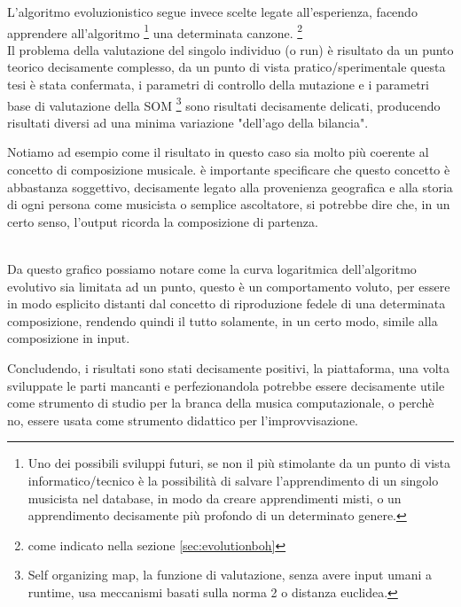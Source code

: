 L'algoritmo evoluzionistico segue invece scelte legate all'esperienza,
facendo apprendere all'algoritmo
\footnote{Uno dei possibili sviluppi futuri, se non il più stimolante da un
punto di vista informatico/tecnico è la possibilità di salvare l'apprendimento
di un singolo musicista nel database, in modo da creare apprendimenti misti,
o un apprendimento decisamente più profondo di un determinato genere.}
una determinata canzone. \footnote{come indicato nella sezione \ref{sec:evolutionboh}}
\\
Il problema della valutazione del singolo individuo (o run) è risultato da un
punto teorico decisamente complesso, da un punto di vista pratico/sperimentale
questa tesi è stata confermata, i parametri di controllo della mutazione e
i parametri base di valutazione della SOM
\footnote{Self organizing map, la funzione di valutazione,
senza avere input umani a runtime, usa meccanismi basati sulla norma 2
o distanza euclidea.}
sono risultati decisamente delicati, producendo risultati diversi ad una minima
variazione "dell'ago della bilancia".


Notiamo ad esempio come il risultato in questo caso sia molto più coerente al
concetto di composizione musicale.
è importante specificare che questo concetto è abbastanza soggettivo,
decisamente legato alla provenienza geografica e alla storia di ogni persona
come musicista o semplice ascoltatore, si potrebbe dire che, in un certo senso,
l'output ricorda la composizione di partenza.

\\

Da questo grafico possiamo notare come la curva logaritmica dell'algoritmo
evolutivo sia limitata ad un punto, questo è un comportamento voluto,
per essere in modo esplicito distanti dal concetto di riproduzione fedele di una
determinata composizione, rendendo quindi il tutto solamente, in un certo modo,
simile alla composizione in input.

Concludendo, i risultati sono stati decisamente positivi, la piattaforma, una volta
sviluppate le parti mancanti e perfezionandola potrebbe essere decisamente utile
come strumento di studio per la branca della musica computazionale, o perchè no,
essere usata come strumento didattico per l'improvvisazione.
